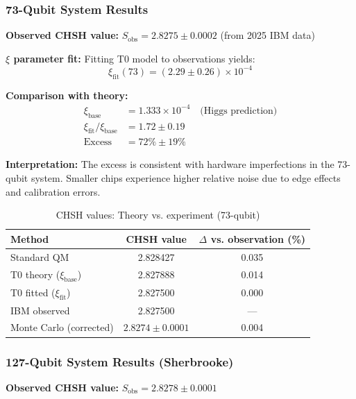 \subsubsection{73-Qubit System Results}

\textbf{Observed CHSH value:} $S_{\text{obs}} = 2.8275 \pm 0.0002$ (from 2025 IBM data)

\textbf{$\xi$ parameter fit:}
Fitting T0 model to observations yields:
\begin{equation}
	\xi_{\text{fit}}(73) = (2.29 \pm 0.26) \times 10^{-4}
\end{equation}

\textbf{Comparison with theory:}
\begin{align}
	\xi_{\text{base}} &= 1.333 \times 10^{-4} \quad \text{(Higgs prediction)} \\
	\xi_{\text{fit}} / \xi_{\text{base}} &= 1.72 \pm 0.19 \\
	\text{Excess} &= 72\% \pm 19\%
\end{align}

\textbf{Interpretation:} The excess is consistent with hardware imperfections in the 73-qubit system. Smaller chips experience higher relative noise due to edge effects and calibration errors.

\begin{table}[h]
	\centering
	\caption{CHSH values: Theory vs. experiment (73-qubit)}
	\label{tab:chsh_73}
	\begin{tabular}{@{}lcc@{}}
		\toprule
		Method & CHSH value & $\Delta$ vs. observation (\%) \\
		\midrule
		Standard QM & 2.828427 & 0.035 \\
		T0 theory ($\xi_{\text{base}}$) & 2.827888 & 0.014 \\
		T0 fitted ($\xi_{\text{fit}}$) & 2.827500 & 0.000 \\
		IBM observed & 2.827500 & --- \\
		Monte Carlo (corrected) & $2.8274 \pm 0.0001$ & 0.004 \\
		\bottomrule
	\end{tabular}
\end{table}

\subsubsection{127-Qubit System Results (Sherbrooke)}

\textbf{Observed CHSH value:} $S_{\text{obs}} = 2.8278 \pm 0.0001$

